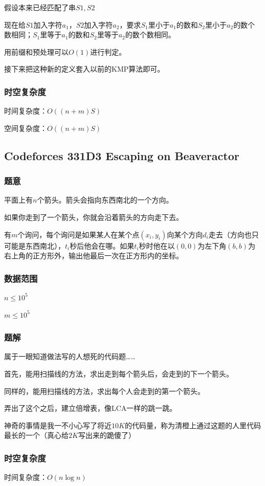 \documentclass{ctexart}
\begin{document}
假设本来已经匹配了串$S1,S2$

现在给$S1$加入字符$a_1$，$S2$加入字符$a_2$，要求$S_1$里小于$a_1$的数和$S_2$里小于$a_2$的数个数相同；$S_1$里等于$a_1$的数和$S_2$里等于$a_2$的数个数相同。

用前缀和预处理可以$O(1)$进行判定。

接下来把这种新的定义套入以前的KMP算法即可。
\subsubsection{时空复杂度}
时间复杂度：$O((n+m)S)$

空间复杂度：$O((n+m)S)$
\subsection{Codeforces 331D3 Escaping on Beaveractor}
\subsubsection{题意}
平面上有$n$个箭头。箭头会指向东西南北的一个方向。

如果你走到了一个箭头，你就会沿着箭头的方向走下去。

有$m$个询问，每个询问是如果某人在某个点$(x_i,y_i)$向某个方向$d_i$走去（方向也只可能是东西南北），$t_i$秒后他会在哪。如果$t_i$秒时他在以$(0,0)$为左下角$(b,b)$为右上角的正方形外，输出他最后一次在正方形内的坐标。
\subsubsection{数据范围}
$n \le 10^5$

$m \le 10^5$
\subsubsection{题解}
属于一眼知道做法写的人想死的代码题……

首先，能用扫描线的方法，求出走到每个箭头后，会走到的下一个箭头。

同样的，能用扫描线的方法，求出每个人会走到的第一个箭头。

弄出了这个之后，建立倍增表，像LCA一样的跳一跳。

神奇的事情是我一不小心写了将近$10K$的代码量，称为清橙上通过这题的人里代码最长的一个（真心给$2K$写出来的跪傻了）
\subsubsection{时空复杂度}
时间复杂度：$O(n \log n)$
\end{document}
